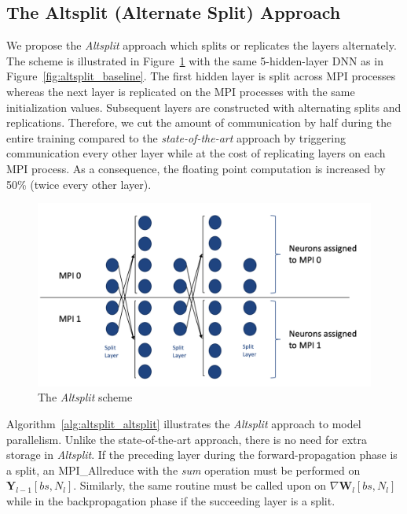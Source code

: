 \subsection{The Altsplit (Alternate Split) Approach}
We propose the \emph{Altsplit} approach which splits or replicates the layers 
alternately. The scheme is illustrated in Figure~\ref{fig:altsplit_scheme} with 
the same 5-hidden-layer DNN as in Figure~\ref{fig:altsplit_baseline}. The first 
hidden layer is split across MPI processes whereas the next layer is replicated 
on the MPI processes with the same initialization values. Subsequent layers are 
constructed with alternating splits and replications. Therefore, we cut the 
amount of communication by half during the entire training compared to the 
\emph{state-of-the-art} approach by triggering communication every other layer while at 
the cost of replicating layers on each MPI process. As a consequence, the floating
point computation is increased by 50\% (twice every other layer).
\begin{figure}[H]
    \centerline{\includegraphics[scale=0.60]{altsplit/figs/altsplit.png}}
    \caption{The \emph{Altsplit} scheme}
    \label{fig:altsplit_scheme}
\end{figure}

Algorithm~\ref{alg:altsplit_altsplit} illustrates the \emph{Altsplit} approach 
to model parallelism. Unlike the state-of-the-art approach, there is no need for extra 
storage in \emph{Altsplit}. If the preceding layer during the 
forward-propagation phase is a split, an MPI\_Allreduce with the \textit{sum} 
operation must be performed on $\pmb{Y}_{l-1}[bs, N_{l}]$. Similarly, the same 
routine must be called upon on $\nabla \pmb{W}_l[bs, N_l]$ while in the 
backpropagation phase if the succeeding layer is a split.

